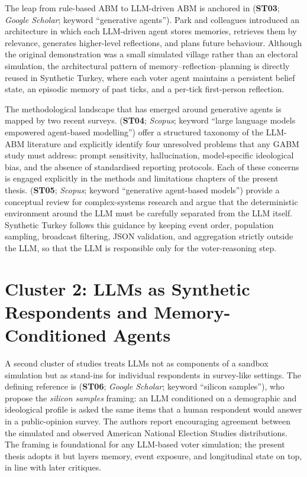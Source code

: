 \documentclass[12pt,a4paper]{report}
\begin{document}
The leap from rule-based ABM to LLM-driven ABM is anchored in \citet{park2023generative} (\textbf{ST03}; \emph{Google Scholar}; keyword \enquote{generative agents}). Park and colleagues introduced an architecture in which each LLM-driven agent stores memories, retrieves them by relevance, generates higher-level reflections, and plans future behaviour. Although the original demonstration was a small simulated village rather than an electoral simulation, the architectural pattern of memory--reflection--planning is directly reused in Synthetic Turkey, where each voter agent maintains a persistent belief state, an episodic memory of past ticks, and a per-tick first-person reflection.

The methodological landscape that has emerged around generative agents is mapped by two recent surveys. \citet{gao2024llmabm} (\textbf{ST04}; \emph{Scopus}; keyword \enquote{large language models empowered agent-based modelling}) offer a structured taxonomy of the LLM-ABM literature and explicitly identify four unresolved problems that any GABM study must address: prompt sensitivity, hallucination, model-specific ideological bias, and the absence of standardised reporting protocols. Each of these concerns is engaged explicitly in the methods and limitations chapters of the present thesis. \citet{lu2024gabs} (\textbf{ST05}; \emph{Scopus}; keyword \enquote{generative agent-based models}) provide a conceptual review for complex-systems research and argue that the deterministic environment around the LLM must be carefully separated from the LLM itself. Synthetic Turkey follows this guidance by keeping event order, population sampling, broadcast filtering, JSON validation, and aggregation strictly outside the LLM, so that the LLM is responsible only for the voter-reasoning step.

\section{Cluster 2: LLMs as Synthetic Respondents and Memory-Conditioned Agents}
\label{sec:litcluster2}

A second cluster of studies treats LLMs not as components of a sandbox simulation but as stand-ins for individual respondents in survey-like settings. The defining reference is \citet{argyle2023out} (\textbf{ST06}; \emph{Google Scholar}; keyword \enquote{silicon samples}), who propose the \emph{silicon samples} framing: an LLM conditioned on a demographic and ideological profile is asked the same items that a human respondent would answer in a public-opinion survey. The authors report encouraging agreement between the simulated and observed American National Election Studies distributions. The framing is foundational for any LLM-based voter simulation; the present thesis adopts it but layers memory, event exposure, and longitudinal state on top, in line with later critiques.
\end{document}
